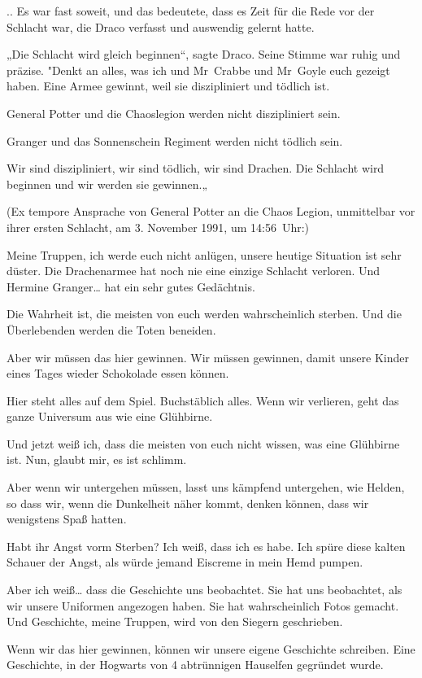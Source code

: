 {.. Es war fast soweit, und das bedeutete, dass es Zeit für die Rede vor der Schlacht war, die Draco verfasst und auswendig gelernt hatte.

„Die Schlacht wird gleich beginnen“, sagte Draco. Seine Stimme war ruhig und präzise. "Denkt an alles, was ich und Mr~Crabbe und Mr~Goyle euch gezeigt haben. Eine Armee gewinnt, weil sie diszipliniert und tödlich ist.

General Potter und die Chaoslegion werden nicht diszipliniert sein.

Granger und das Sonnenschein Regiment werden nicht tödlich sein.

Wir sind diszipliniert, wir sind tödlich, wir sind Drachen. Die Schlacht wird beginnen und wir werden sie gewinnen.„

(Ex tempore Ansprache von General Potter an die Chaos Legion, unmittelbar vor ihrer ersten Schlacht, am 3. November 1991, um 14:56~Uhr:)

Meine Truppen, ich werde euch nicht anlügen, unsere heutige Situation ist sehr düster. Die Drachenarmee hat noch nie eine einzige Schlacht verloren. Und Hermine Granger… hat ein sehr gutes Gedächtnis.

Die Wahrheit ist, die meisten von euch werden wahrscheinlich sterben. Und die Überlebenden werden die Toten beneiden.

Aber wir müssen das hier gewinnen. Wir müssen gewinnen, damit unsere Kinder eines Tages wieder Schokolade essen können.

Hier steht alles auf dem Spiel. Buchstäblich alles. Wenn wir verlieren, geht das ganze Universum aus wie eine Glühbirne.

Und jetzt weiß ich, dass die meisten von euch nicht wissen, was eine Glühbirne ist. Nun, glaubt mir, es ist schlimm.

Aber wenn wir untergehen müssen, lasst uns kämpfend untergehen, wie Helden, so dass wir, wenn die Dunkelheit näher kommt, denken können, dass wir wenigstens Spaß hatten.

Habt ihr Angst vorm Sterben? Ich weiß, dass ich es habe. Ich spüre diese kalten Schauer der Angst, als würde jemand Eiscreme in mein Hemd pumpen.

Aber ich weiß… dass die Geschichte uns beobachtet. Sie hat uns beobachtet, als wir unsere Uniformen angezogen haben. Sie hat wahrscheinlich Fotos gemacht. Und Geschichte, meine Truppen, wird von den Siegern geschrieben.

Wenn wir das hier gewinnen, können wir unsere eigene Geschichte schreiben. Eine Geschichte, in der Hogwarts von 4 abtrünnigen Hauselfen gegründet wurde.

}
